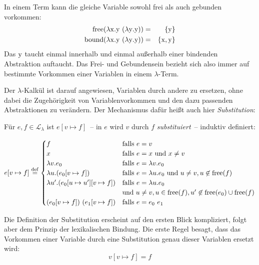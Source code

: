 In einem Term kann die gleiche Variable sowohl frei als auch gebunden
vorkommen:
%
\begin{eqnarray*}
  \operatorname{free}(\lambda \mathrm x.\mathrm y~(\lambda \mathrm y.\mathrm y)) &=& \{ \mathrm y\} \\
  \operatorname{bound}(\lambda \mathrm x.\mathrm y~(\lambda \mathrm y.\mathrm y)) &=& \{ \mathrm x,
                                                            \mathrm y\}
\end{eqnarray*}
%
Das $\mathrm y$ taucht einmal innerhalb und einmal außerhalb einer bindenden
Abstraktion auftaucht. Das Frei- und Gebundensein bezieht sich also
immer auf bestimmte Vorkommen einer Variablen in
einem $\lambda$-Term.

Der $\lambda$-Kalkül ist darauf
angewiesen, Variablen durch andere zu ersetzen, ohne dabei die
Zugehörigkeit von Variablenvorkommen und den dazu passenden
Abstraktionen zu verändern.  Der Mechanismus dafür heißt auch hier
\textit{Substitution}:
%
\begin{definition}[Substitution]\label{def:substitution}
  Für $e,f\in \mathcal{L}_{\lambda}$ ist $e[v\mapsto f]$~-- in $e$ wird $v$ durch $f$
  \textit{substituiert}~-- induktiv definiert:

  \begin{displaymath}
    e[v\mapsto f] \stackrel{\rm def}{=}
    \begin{cases}
      f & \text{falls } e = v\\
      x & \text{falls } e = x \text{ und } x \neq v\\
      \lambda v.e_0 & \text{falls } e = \lambda v.e_0\\
      \lambda u.(e_0[v\mapsto f]) & \text{falls } e = \lambda u.e_0 \text{
        und } u\neq v, u\not\in\operatorname{free}(f)\\
      \lambda u'.(e_0[u\mapsto u'][v\mapsto f]) & \text{falls }
      e = \lambda u.e_0 \\ & \text{und }
      u \neq v,u\in\operatorname{free}(f), u'\not\in\operatorname{free}(e_0)\cup\operatorname{free}(f)\\
      (e_0[v\mapsto f])~(e_1[v\mapsto f]) &
      \text{falls } e = e_0~e_1
    \end{cases}
  \end{displaymath}
  \end{definition}
%
Die Definition der Substitution erscheint auf den ersten Blick
kompliziert, folgt aber dem Prinzip der
lexikalischen Bindung.  Die erste Regel besagt, dass das Vorkommen
einer Variable durch eine Substitution genau dieser Variablen ersetzt
wird:
%
\begin{displaymath}
      v[v\mapsto f] = f
\end{displaymath}
